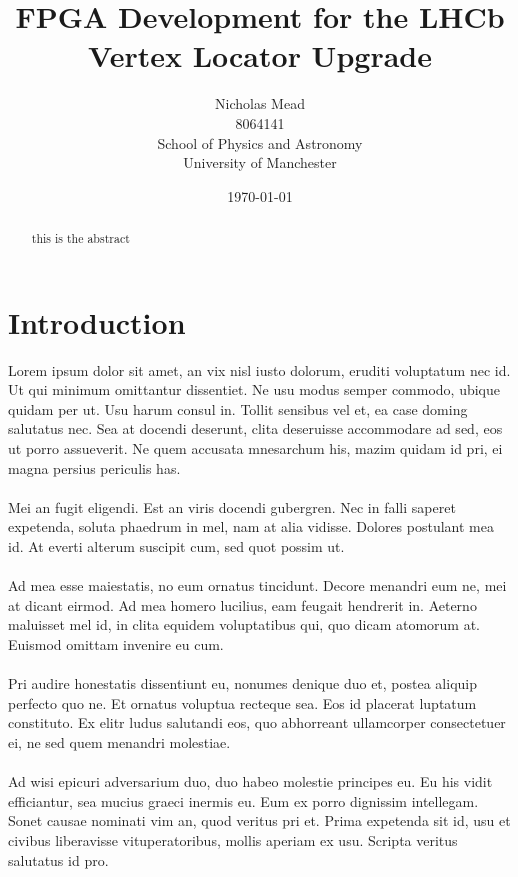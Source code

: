 \documentclass[a4paper,10pt,oneside]{article}
\title{FPGA Development for the LHCb Vertex Locator Upgrade}
\author
{
	Nicholas Mead\\
	8064141\\
	School of Physics and Astronomy\\
	University of Manchester
}
\date{\today}
\begin{document}
	\begin{titlepage}
	\clearpage
	\maketitle \thispagestyle{empty}
	\vspace{1em}
	\begin{abstract}

	this is the abstract

	\end{abstract}
	\end{titlepage}

	\section{Introduction}
	Lorem ipsum dolor sit amet, an vix nisl iusto dolorum, eruditi voluptatum nec id. Ut qui minimum omittantur dissentiet. Ne usu modus semper commodo, ubique quidam per ut. Usu harum consul in. Tollit sensibus vel et, ea case doming salutatus nec. Sea at docendi deserunt, clita deseruisse accommodare ad sed, eos ut porro assueverit. Ne quem accusata mnesarchum his, mazim quidam id pri, ei magna persius periculis has.
	\\ \\
	Mei an fugit eligendi. Est an viris docendi gubergren. Nec in falli saperet expetenda, soluta phaedrum in mel, nam at alia vidisse. Dolores postulant mea id. At everti alterum suscipit cum, sed quot possim ut.
	\\ \\
	Ad mea esse maiestatis, no eum ornatus tincidunt. Decore menandri eum ne, mei at dicant eirmod. Ad mea homero lucilius, eam feugait hendrerit in. Aeterno maluisset mel id, in clita equidem voluptatibus qui, quo dicam atomorum at. Euismod omittam invenire eu cum.
	\\ \\
	Pri audire honestatis dissentiunt eu, nonumes denique duo et, postea aliquip perfecto quo ne. Et ornatus voluptua recteque sea. Eos id placerat luptatum constituto. Ex elitr ludus salutandi eos, quo abhorreant ullamcorper consectetuer ei, ne sed quem menandri molestiae.
	\\ \\
	Ad wisi epicuri adversarium duo, duo habeo molestie principes eu. Eu his vidit efficiantur, sea mucius graeci inermis eu. Eum ex porro dignissim intellegam. Sonet causae nominati vim an, quod veritus pri et. Prima expetenda sit id, usu et civibus liberavisse vituperatoribus, mollis aperiam ex usu. Scripta veritus salutatus id pro.
\end{document}
